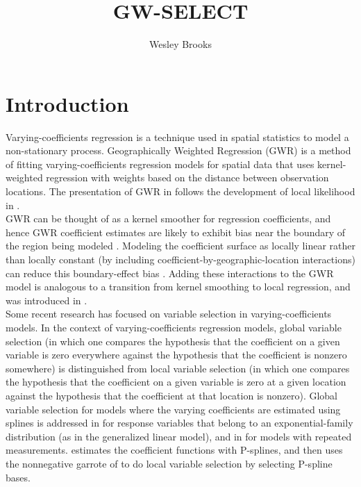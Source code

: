 \documentclass[authoryear, review, 11pt]{elsarticle}
\title{GW-SELECT}
\author{Wesley Brooks}
\date{}                                           %
\begin{document}
\maketitle





\section{Introduction}
	Varying-coefficients regression \citep{Hastie:1993a} is a technique used in spatial statistics to model a non-stationary process. Geographically Weighted Regression (GWR) \citep{Fotheringham:2002} is a method of fitting varying-coefficients regression models for spatial data that uses kernel-weighted regression with weights based on the distance between observation locations. The presentation of GWR in \cite{Fotheringham:2002} follows the development of local likelihood in \cite{Loader:1999}.\\
	
	GWR can be thought of as a kernel smoother for regression coefficients, and hence GWR coefficient estimates are likely to exhibit bias near the boundary of the region being modeled \citep{Hastie:1993b}. Modeling the coefficient surface as locally linear rather than locally constant (by including coefficient-by-geographic-location interactions) can reduce this boundary-effect bias \citep{Hastie:1993b}. Adding these interactions to the GWR model is analogous to a transition from kernel smoothing to local regression, and was introduced in \cite{Wang:2008b}.\\
	
	Some recent research has focused on variable selection in varying-coefficients models. In the context of varying-coefficients regression models, global variable selection (in which one compares the hypothesis that the coefficient on a given variable is zero everywhere against the hypothesis that the coefficient is nonzero somewhere) is distinguished from local variable selection (in which one compares the hypothesis that the coefficient on a given variable is zero at a given location against the hypothesis that the coefficient at that location is nonzero). Global variable selection for models where the varying coefficients are estimated using splines is addressed in \cite{Fan:1999} for response variables that belong to an exponential-family distribution (as in the generalized linear model), and in \cite{Wang:2008a} for models with repeated measurements. \cite{Antoniadis:2011} estimates the coefficient functions with P-splines, and then uses the nonnegative garrote of \cite{Breiman:1995} to do local variable selection by selecting P-spline bases.\\
	
\end{document}
